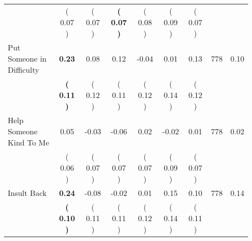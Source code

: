 \begin{tabular}{lcccccccc}
 & (     0.07 ) & (     0.07 ) & \textbf{(     0.07 )} & (     0.08 ) & (     0.09 ) & (     0.07 ) & \\
Put Someone in Difficulty & \textbf{     0.23} &      0.08 &      0.12 &     -0.04 &      0.01 &      0.13 & 778 &       0.10 \\ 
 & \textbf{(     0.11 )} & (     0.12 ) & (     0.11 ) & (     0.12 ) & (     0.14 ) & (     0.12 ) & \\
Help Someone Kind To Me &      0.05 &     -0.03 &     -0.06 &      0.02 &     -0.02 &      0.01 & 778 &       0.02 \\ 
 & (     0.06 ) & (     0.07 ) & (     0.07 ) & (     0.07 ) & (     0.09 ) & (     0.07 ) & \\
Insult Back & \textbf{     0.24} &     -0.08 &     -0.02 &      0.01 &      0.15 &      0.10 & 778 &       0.14 \\ 
 & \textbf{(     0.10 )} & (     0.11 ) & (     0.11 ) & (     0.12 ) & (     0.14 ) & (     0.11 ) & \\
\bottomrule
\end{tabular}

